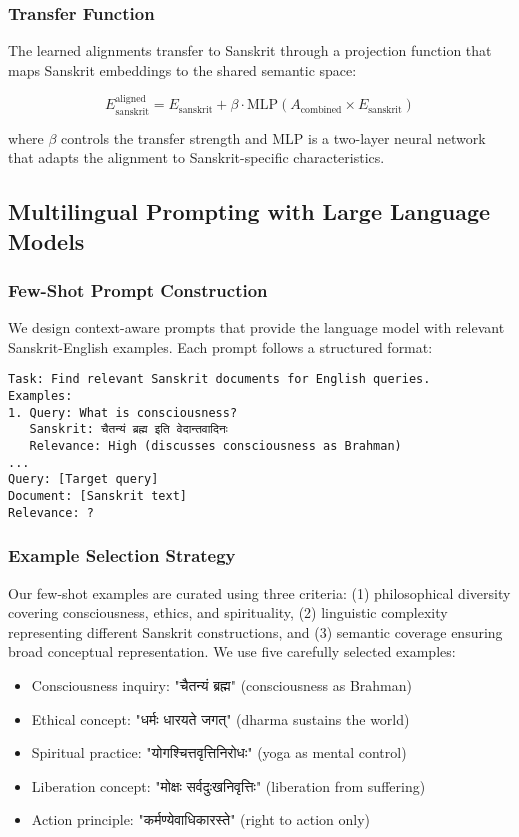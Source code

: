 \documentclass[runningheads]{llncs}
\begin{document}
\subsubsection{Transfer Function}
The learned alignments transfer to Sanskrit through a projection function that maps Sanskrit embeddings to the shared semantic space:

\begin{equation}
E_{\text{sanskrit}}^{\text{aligned}} = E_{\text{sanskrit}} + \beta \cdot \text{MLP}(A_{\text{combined}} \times E_{\text{sanskrit}})
\end{equation}

where $\beta$ controls the transfer strength and MLP is a two-layer neural network that adapts the alignment to Sanskrit-specific characteristics.

\subsection{Multilingual Prompting with Large Language Models}

\subsubsection{Few-Shot Prompt Construction}
We design context-aware prompts that provide the language model with relevant Sanskrit-English examples. Each prompt follows a structured format:

\begin{verbatim}
Task: Find relevant Sanskrit documents for English queries.
Examples:
1. Query: What is consciousness?
   Sanskrit: चैतन्यं ब्रह्म इति वेदान्तवादिनः
   Relevance: High (discusses consciousness as Brahman)
...
Query: [Target query]
Document: [Sanskrit text]
Relevance: ?
\end{verbatim}

\subsubsection{Example Selection Strategy}
Our few-shot examples are curated using three criteria: (1) philosophical diversity covering consciousness, ethics, and spirituality, (2) linguistic complexity representing different Sanskrit constructions, and (3) semantic coverage ensuring broad conceptual representation. We use five carefully selected examples:

\begin{itemize}
\item Consciousness inquiry: "चैतन्यं ब्रह्म" (consciousness as Brahman)
\item Ethical concept: "धर्मः धारयते जगत्" (dharma sustains the world)
\item Spiritual practice: "योगश्चित्तवृत्तिनिरोधः" (yoga as mental control)
\item Liberation concept: "मोक्षः सर्वदुःखनिवृत्तिः" (liberation from suffering)
\item Action principle: "कर्मण्येवाधिकारस्ते" (right to action only)
\end{itemize}
\end{document}
